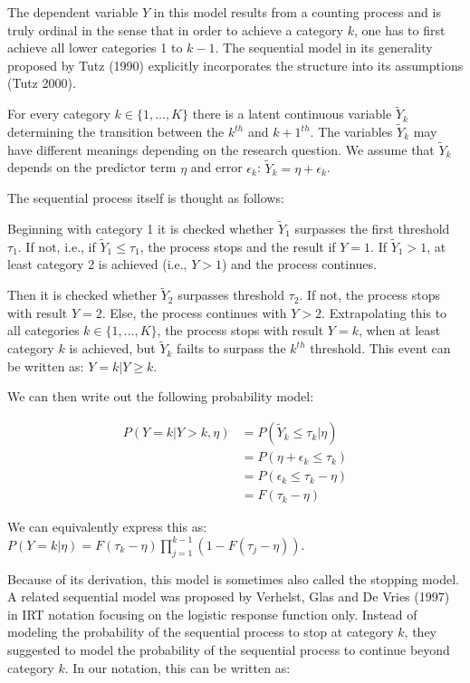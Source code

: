 The dependent variable $Y$ in this model results from a counting process and is truly ordinal in the sense that in order to achieve a category $k$, one has to first achieve all lower categories 1 to $k-1$. The sequential model in its generality proposed by Tutz (1990) explicitly incorporates the structure into its assumptions (Tutz 2000).

For every category $k \in \{1, \ldots, K \}$ there is a latent continuous variable $\tilde Y_{k}$ determining the transition between the $k^{th}$ and $k+1^{th}$. The variables $\tilde Y_{k}$ may have different meanings depending on the research question. We assume that $\tilde Y_{k}$ depends on the predictor term $\eta$ and error $\epsilon_{k}$: $\tilde Y_{k} = \eta + \epsilon_{k}$.

The sequential process itself is thought as follows:

Beginning with category 1 it is checked whether $\tilde Y_{1}$ surpasses the first threshold $\tau_{1}$. If not, i.e., if $\tilde Y_{1} \leq \tau_{1}$, the process stops and the result if $Y=1$. If $\tilde Y_{1} > 1$, at least category 2 is achieved (i.e., $Y>1$) and the process continues.

Then it is checked whether $\tilde Y_{2}$ surpasses threshold $\tau_{2}$. If not, the process stops with result $Y=2$. Else, the process continues with $Y>2$. Extrapolating this to all categories $k \in \{1, \ldots, K \}$, the process stops with result $Y=k$, when at least category $k$ is achieved, but $\tilde Y_{k}$ failts to surpass the $k^{th}$ threshold. This event can be written as: $Y = k|Y \geq k$.

We can then write out the following probability model:

\begin{align*}
P(Y = k | Y>k, \eta) &= P(\tilde Y_{k} \leq \tau_{k} | \eta) \\
&= P(\eta + \epsilon_{k} \leq \tau_{k}) \\
&= P(\epsilon_{k} \leq \tau_{k} - \eta) \\
&= F(\tau_{k} - \eta)
\end{align*}

We can equivalently express this as: $P(Y = k | \eta) = F(\tau_{k} - \eta) \prod_{j=1}^{k-1} (1-F(\tau_{j} - \eta))$.

Because of its derivation, this model is sometimes also called the stopping model. A related sequential model was proposed by Verhelst, Glas and De Vries (1997) in IRT notation focusing on the logistic response function only. Instead of modeling the probability of the sequential process to stop at category $k$, they suggested to model the probability of the sequential process to continue beyond category $k$. In our notation, this can be written as:

